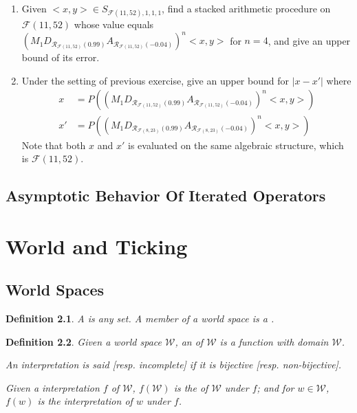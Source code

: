 \documentclass{book}
\newtheorem{definition}{Definition}
\theoremstyle{definition}\newtheorem{mechanism}{Mechanism}
\theoremstyle{remark}\newtheorem*{remark}{Remark}
\begin{document}
\begin{enumerate}
	 And show that it has an error smaller than $10^{-10}$ without running the code above.
	 \item Given $<x, y> \in S_{\mathcal F(11, 52), 1, 1, 1}$, find a stacked arithmetic procedure on $\mathcal F(11, 52)$ whose value equals $(M_{1}D_{\mathcal R_{\mathcal F(11, 52)}(0.99)}A_{\mathcal R_{\mathcal F(11, 52)}(-0.04)})^n<x, y>$ for $n = 4$, and give an upper bound of its error.
	 \item Under the setting of previous exercise, give an upper bound for $|x - x'|$ where 
	 \begin{align*}
	 	x &= P((M_{1}D_{\mathcal R_{\mathcal F(11, 52)}(0.99)}A_{\mathcal R_{\mathcal F(11, 52)}(-0.04)})^n<x, y>)\\ 
	 	x' &= P((M_{1}D_{\mathcal R_{\mathcal F(8, 23)}(0.99)}A_{\mathcal R_{\mathcal F(8, 23)}(-0.04)})^n<x, y>)
	 \end{align*}
	 Note that both $x$ and $x'$ is evaluated on the same algebraic structure, which is $\mathcal F(11, 52)$.
\end{enumerate}


\section{Asymptotic Behavior Of Iterated Operators}



\chapter{World and Ticking}

\section{World Spaces}

\begin{definition}
	A  is any set. A member of a world space is a .
\end{definition}

\begin{definition}
	Given a world space $\mathcal W$, an  of $\mathcal W$ is a function with domain $\mathcal W$.
	
	An interpretation is said  [resp. incomplete] if it is bijective [resp. non-bijective].
	
	Given a interpretation $f$ of $\mathcal W$, $f(\mathcal W)$ is the  of $\mathcal W$ under $f$; and for $w\in \mathcal W$, $f(w)$ is the interpretation of $w$ under $f$.
\end{definition}
\end{document}
